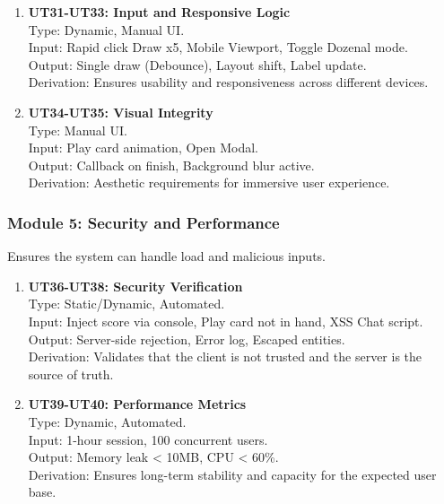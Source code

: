 \documentclass[12pt, titlepage]{article}
\begin{document}
\begin{enumerate}
    \item \textbf{UT31-UT33: Input and Responsive Logic}\\
    Type: Dynamic, Manual UI. \\
    Input: Rapid click Draw x5, Mobile Viewport, Toggle Dozenal mode. \\
    Output: Single draw (Debounce), Layout shift, Label update. \\
    Derivation: Ensures usability and responsiveness across different devices.

    \item \textbf{UT34-UT35: Visual Integrity}\\
    Type: Manual UI. \\
    Input: Play card animation, Open Modal. \\
    Output: Callback on finish, Background blur active. \\
    Derivation: Aesthetic requirements for immersive user experience.
\end{enumerate}

\subsubsection{Module 5: Security and Performance}
Ensures the system can handle load and malicious inputs.

\begin{enumerate}
    \item \textbf{UT36-UT38: Security Verification}\\
    Type: Static/Dynamic, Automated. \\
    Input: Inject score via console, Play card not in hand, XSS Chat script. \\
    Output: Server-side rejection, Error log, Escaped entities. \\
    Derivation: Validates that the client is not trusted and the server is the source of truth.

    \item \textbf{UT39-UT40: Performance Metrics}\\
    Type: Dynamic, Automated. \\
    Input: 1-hour session, 100 concurrent users. \\
    Output: Memory leak < 10MB, CPU < 60\%. \\
    Derivation: Ensures long-term stability and capacity for the expected user base.
\end{enumerate}
\end{document}
